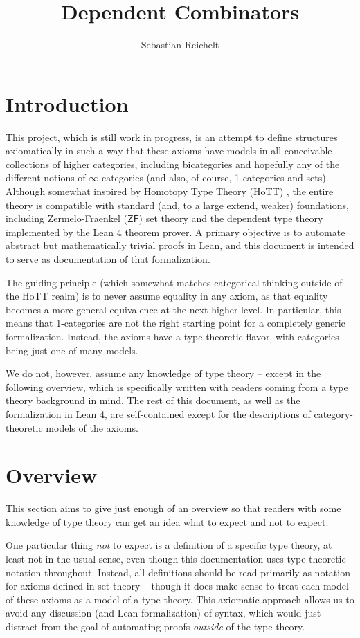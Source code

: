 \documentclass[a4paper]{article}
\title{Dependent Combinators}
\author{Sebastian Reichelt}
\theoremstyle{definition}
\theoremstyle{remark}
\newcommand{\ZF}{\mathsf{ZF}}
\begin{document}
\maketitle

\section{Introduction}

This project, which is still work in progress, is an attempt to define structures axiomatically in
such a way that these axioms have models in all conceivable collections of higher categories,
including bicategories and hopefully any of the different notions of $\infty$-categories (and also,
of course, 1-categories and sets).
Although somewhat inspired by Homotopy Type Theory (HoTT) \cite{hottbook}, the entire theory is
compatible with standard (and, to a large extend, weaker) foundations, including Zermelo-Fraenkel
($\ZF$) set theory and the dependent type theory implemented by the Lean 4 \cite{lean4} theorem
prover. A primary objective is to automate abstract but mathematically trivial proofs in Lean, and
this document is intended to serve as documentation of that formalization.

The guiding principle (which somewhat matches categorical thinking outside of the HoTT realm) is to
never assume equality in any axiom, as that equality becomes a more general equivalence at the next
higher level. In particular, this means that 1-categories are not the right starting point for a
completely generic formalization. Instead, the axioms have a type-theoretic flavor, with categories
being just one of many models.

We do not, however, assume any knowledge of type theory -- except in the following overview, which
is specifically written with readers coming from a type theory background in mind. The rest of this
document, as well as the formalization in Lean 4, are self-contained except for the descriptions of
category-theoretic models of the axioms.

\section{Overview}

This section aims to give just enough of an overview so that readers with some knowledge of type
theory can get an idea what to expect and not to expect.

One particular thing \emph{not} to expect is a definition of a specific type theory, at least not in
the usual sense, even though this documentation uses type-theoretic notation throughout. Instead,
all definitions should be read primarily as notation for axioms defined in set theory -- though
it does make sense to treat each model of these axioms as a model of a type theory. This axiomatic
approach allows us to avoid any discussion (and Lean formalization) of syntax, which would just
distract from the goal of automating proofs \emph{outside} of the type theory.
\end{document}
